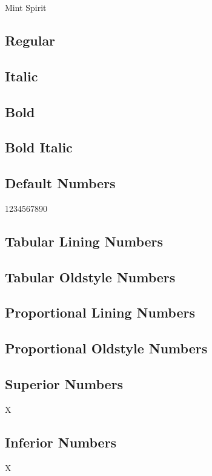 \documentclass{article}
\begin{document}
\begin{center}\huge
Mint Spirit
\end{center}

\subsection*{Regular}
\lipsum[1]

\subsection*{Italic}
\textit{\lipsum[2]} 

\subsection*{Bold}
\textbf{\lipsum[3]}

\subsection*{Bold Italic}

\textbf{\textit{\lipsum[4]}}


\subsection*{Default Numbers}

1234567890


\subsection*{Tabular Lining Numbers}


\subsection*{Tabular Oldstyle Numbers}


\subsection*{Proportional Lining Numbers}


\subsection*{Proportional Oldstyle Numbers}


\subsection*{Superior Numbers}

X

\subsection*{Inferior Numbers}

X
\end{document}
